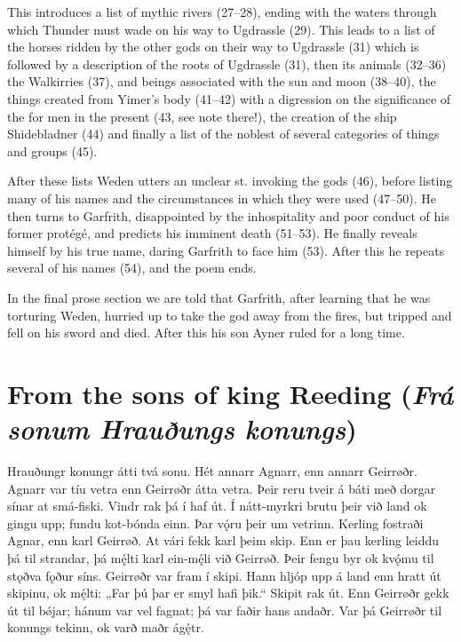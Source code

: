 This introduces a list of mythic rivers (27–28), ending with the waters through which Thunder must wade on his way to Ugdrassle (29). This leads to a list of the horses ridden by the other gods on their way to Ugdrassle (31) which is followed by a description of the roots of Ugdrassle (31), then its animals (32–36) the Walkirries (37), and beings associated with the sun and moon (38–40), the things created from Yimer’s body (41–42) with a digression on the significance of the  for men in the present (43, see note there!), the creation of the ship Shidebladner (44) and finally a list of the noblest of several categories of things and groups (45).

After these lists Weden utters an unclear st. invoking the gods (46), before listing many of his names and the circumstances in which they were used (47–50). He then turns to Garfrith, disappointed by the inhospitality and poor conduct of his former protégé, and predicts his imminent death (51–53). He finally reveals himself by his true name, daring Garfrith to face him (53). After this he repeats several of his names (54), and the poem ends.

In the final prose section we are told that Garfrith, after learning that he was torturing Weden, hurried up to take the god away from the fires, but tripped and fell on his sword and died. After this his son Ayner ruled for a long time.

\sectionline

\section{From the sons of king Reeding (\emph{Frá sonum Hrauðungs konungs})}

\bpg\bpa[1a]Hrauðungr konungr átti tvá sonu. Hét annarr Agnarr, enn annarr Geirrøðr.
Agnarr var tíu vetra enn Geirrøðr átta vetra. Þeir reru tveir á báti með dorgar sínar at smá-fiski.
Vindr rak þá í haf út. Í nátt-myrkri brutu þeir við land ok gingu upp; fundu kot-bónda einn.
Þar vǫ́ru þeir um vetrinn. Kerling fostraði Agnar, enn karl Geirrøð.
At vári fekk karl þeim skip. Enn er þau kerling leiddu þá til strandar, þá mę́lti karl ein-mę́li við Geirrøð.
Þeir fengu byr ok kvǫ́mu til stǫðva fǫður síns. Geirrøðr var fram í skipi.
Hann hljóp upp á land enn hratt út skipinu, ok mę́lti: „Far þú þar er smyl hafi þik.“
Skipit rak út. Enn Geirrøðr gekk út til bǿjar; hánum var vel fagnat; þá var faðir hans andaðr.
Var þá Geirrøðr til konungs tekinn, ok varð maðr ágę́tr.\epa

